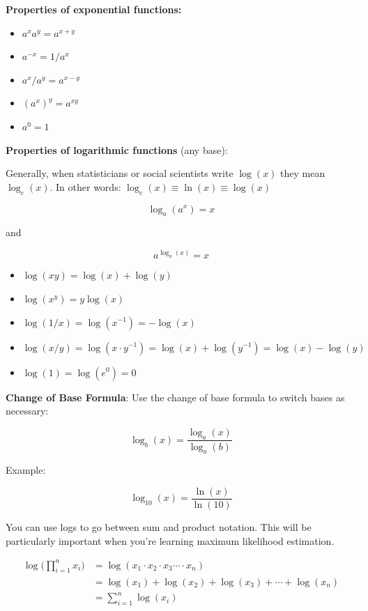 \documentclass[
  letterpaper,
]{book}
\providecommand{\tightlist}{%
  \setlength{\itemsep}{0pt}\setlength{\parskip}{0pt}}\usepackage{longtable,booktabs,array}
\theoremstyle{definition}
\theoremstyle{definition}
\theoremstyle{plain}
\theoremstyle{definition}
\theoremstyle{plain}
\theoremstyle{plain}
\theoremstyle{remark}
\begin{document}

\textbf{Properties of exponential functions:}

\begin{itemize}
\tightlist
\item
  \(a^x a^y = a^{x+y}\)
\item
  \(a^{-x} = 1/a^x\)
\item
  \(a^x/a^y = a^{x-y}\)
\item
  \((a^x)^y = a^{x y}\)
\item
  \(a^0 = 1\)
\end{itemize}

\textbf{Properties of logarithmic functions} (any base):

Generally, when statisticians or social scientists write \(\log(x)\)
they mean \(\log_e(x)\). In other words:
\(\log_e(x) \equiv \ln(x) \equiv \log(x)\)

\[
\log_a(a^x)=x
\]

and

\[
a^{\log_a(x)}=x
\]

\begin{itemize}
\tightlist
\item
  \(\log(x y)=\log(x)+\log(y)\)
\item
  \(\log(x^y)=y\log(x)\)
\item
  \(\log(1/x)=\log(x^{-1})=-\log(x)\)
\item
  \(\log(x/y)=\log(x\cdot y^{-1})=\log(x)+\log(y^{-1})=\log(x)-\log(y)\)
\item
  \(\log(1)=\log(e^0)=0\)
\end{itemize}

\textbf{Change of Base Formula}: Use the change of base formula to
switch bases as necessary:

\[
\log_b(x) = \frac{\log_a(x)}{\log_a(b)}
\]

Example:

\[
\log_{10}(x) = \frac{\ln(x)}{\ln(10)}
\]

You can use logs to go between sum and product notation. This will be
particularly important when you're learning maximum likelihood
estimation.

\[
\begin{aligned}
            \log \bigg(\prod\limits_{i=1}^n x_i \bigg) 
            &= \log(x_1 \cdot x_2 \cdot x_3 \cdots \cdot x_n) \\
            &= \log(x_1) + \log(x_2) + \log(x_3) + \cdots + \log(x_n) \\
            &= \sum\limits_{i=1}^n \log (x_i)
\end{aligned}
\]
\end{document}
